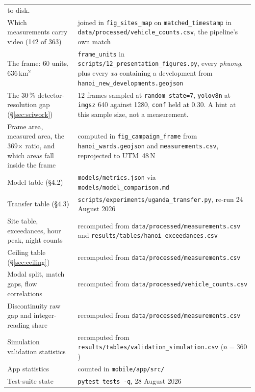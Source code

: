 \documentclass[11pt,a4paper]{article}
\newcommand{\pth}[1]{\texttt{\small #1}}
\begin{document}
\begin{center}
\begin{tabular}{@{}p{4.4cm}p{9.4cm}@{}}
 to disk. \\
Which measurements carry video (142 of 363) & joined in
 \pth{fig\_sites\_map} on \pth{matched\_timestamp} in
 \pth{data/processed/vehicle\_counts.csv}, the pipeline's own match \\
The frame: 60 units, 636\,km$^2$ & \pth{frame\_units} in
 \pth{scripts/12\_presentation\_figures.py}, every \emph{phuong}, plus every
 \emph{xa} containing a development from
 \pth{hanoi\_new\_developments.geojson} \\
The 30\,\% detector-resolution gap (§\ref{sec:sciwork}) & 12 frames sampled at
 \pth{random\_state=7}, \pth{yolov8n} at \pth{imgsz} 640 against 1280,
 \pth{conf} held at 0.30. A hint at this sample size, not a measurement. \\
Frame area, measured area, the 369$\times$ ratio, and which areas fall inside
 the frame & computed in \pth{fig\_campaign\_frame} from
 \pth{hanoi\_wards.geojson} and \pth{measurements.csv}, reprojected to
 UTM~48\,N \\
Model table (§4.2) & \pth{models/metrics.json} via \pth{models/model\_comparison.md} \\
Transfer table (§4.3) & \pth{scripts/experiments/uganda\_transfer.py}, re-run 24 August 2026 \\
Site table, exceedances, hour peak, night counts & recomputed from
 \pth{data/processed/measurements.csv} and
 \pth{results/tables/hanoi\_exceedances.csv} \\
Ceiling table (§\ref{sec:ceiling}) & recomputed from
 \pth{data/processed/measurements.csv} \\
Modal split, match gaps, flow correlations & recomputed from
 \pth{data/processed/vehicle\_counts.csv} \\
Discontinuity raw gap and integer-reading share & recomputed from
 \pth{data/processed/measurements.csv} \\
Simulation validation statistics & recomputed from
 \pth{results/tables/validation\_simulation.csv} ($n=360$) \\
App statistics & counted in \pth{mobile/app/src/} \\
Test-suite state & \pth{pytest tests -q}, 28 August 2026 \\
\bottomrule
\end{tabular}
\end{center}

\clearpage

\renewcommand{\refname}{References}

\end{document}
